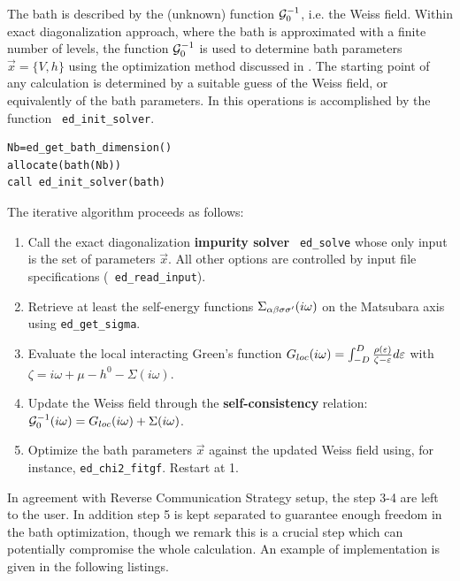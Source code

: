 \documentclass[edipack2.tex]{subfiles}
\begin{document}
The bath is described
by the (unknown) function ${\cal G}^{-1}_0$, i.e. the Weiss field. Within \NAME
exact diagonalization approach, where the bath is approximated with a
finite number of levels, the function ${\cal G}^{-1}_0$ is used to
determine bath parameters $\vec{x}=\{V,h\}$ using the optimization method discussed in
.
The starting point of any calculation is determined by a suitable
guess of the Weiss field, or equivalently of the bath parameters.
In \NAME this operations is accomplished by the function {\tt
  ed\_init\_solver}.

\begin{lstlisting}[style=fstyle,numbers=none,basicstyle={\scriptsize\ttfamily}]
Nb=ed_get_bath_dimension()
allocate(bath(Nb))
call ed_init_solver(bath)
\end{lstlisting}








The iterative algorithm proceeds as follows:
\begin{enumerate}
\item Call the exact diagonalization {\bf impurity solver} {\tt
    ed\_solve} whose only input is the set of parameters $\vec{x}$. All other
  options are controlled by input file specifications ({\tt
    ed\_read\_input}).
\item Retrieve at least the self-energy functions $\Sigma_{\alpha\beta\sigma\sigma'}(i\omega)$ on the
  Matsubara axis using {\tt ed\_get\_sigma}.
\item Evaluate the local interacting Green's function
  $G_{loc}(i\omega) = \int_{-D}^D \frac{\rho(\varepsilon)}{\zeta -\varepsilon}d\varepsilon$ with
  $\zeta=i\omega+\mu-h^0-\Sigma(i\omega)$.
  \item Update the Weiss field through the {\bf self-consistency}
    relation: ${\cal G}^{-1}_0(i\omega) = G_{loc}(i\omega) + \Sigma(i\omega)$. 
  \item Optimize the bath parameters $\vec{x}$ against the updated
    Weiss field using, for instance, {\tt ed\_chi2\_fitgf}. Restart at 1.
\end{enumerate}
In agreement with Reverse Communication Strategy setup, the step 3-4
are left to the user. In addition step 5 is kept separated to
guarantee enough freedom in the bath optimization, though we remark
this is a crucial step which can potentially compromise the whole
calculation.
An example of implementation is given in the following listings.
\end{document}
